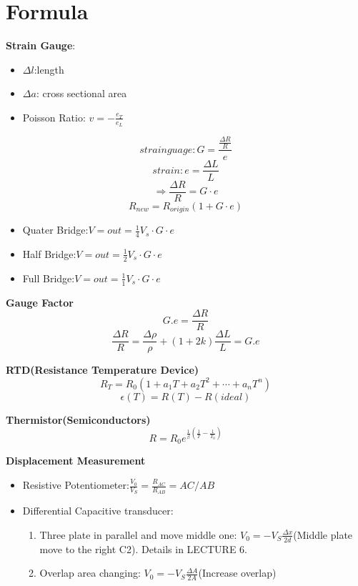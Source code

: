 \documentclass{article}
\begin{document}
	\normalsize
	\section{Formula}
	\textbf{Strain Gauge}:
	\begin{itemize}
		\item $\Delta l$:length
		\item $\Delta a$: cross sectional area
		\item Poisson Ratio: $v = -\frac{e_T}{e_L}$
	\end{itemize}
	$$strain guage:G=\frac{\frac{\Delta R}{R}}{e}$$
	$$strain: e=\frac{\Delta L}{L}$$
	$$\Rightarrow \frac{\Delta R}{R}=G\cdot e$$
	$$R_{new}=R_{origin}(1+G\cdot e)$$
	
	\begin{itemize}
		\item Quater Bridge:$V={out}=\frac{1}{4}V_s\cdot G\cdot e$
		\item Half Bridge:$V={out}=\frac{1}{2}V_s\cdot G\cdot e$
		\item Full Bridge:$V={out}=\frac{1}{1}V_s\cdot G\cdot e$
	\end{itemize}
	
	
	
	\textbf{Gauge Factor} $$ G.e = \frac{\Delta R}{R} $$
	$$\frac{\Delta R}{R} = \frac{\Delta \rho}{\rho} + (1+2k)\frac{\Delta L}{L} = G.e$$
	
	
	\textbf{RTD(Resistance Temperature Device)} 
	$$R_T = R_0(1+a_1T + a_2T^2 + \cdots + a_nT^n)$$
	$$\epsilon(T) = R(T) - R(ideal)$$
	
	
	\textbf{Thermistor(Semiconductors)}
	$$R = R_0e^{\frac{1}{\beta}(\frac{1}{T} - \frac{1}{T_0})}$$
	
	
	
	\textbf{Displacement Measurement}
	\begin{itemize}
		\item Resistive Potentiometer:$\displaystyle \frac{V_0}{V_S}=\frac{R_{AC}}{R_{AB}}=AC/AB$
		\item Differential Capacitive transducer:
		\begin{enumerate}
			\item Three plate in parallel and move middle one: $\displaystyle V_0=-V_S\frac{\Delta x}{2d} $(Middle plate move to the right C2). Details in LECTURE 6.
			\item Overlap area changing: $\displaystyle V_0=-V_S\frac{\Delta A}{2A} $(Increase overlap)
		\end{enumerate}
	\end{itemize}
	
\end{document}
